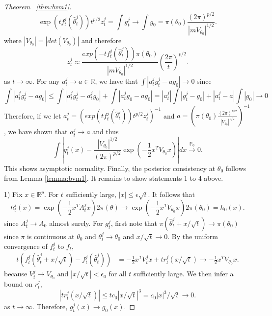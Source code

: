 \documentclass[twoside,11pt]{article}
\numberwithin{equation}{section}
\newcommand{\R}{{\mathbb{R}}}
\newcommand\bP{\mathbb{P}}
\newcommand{\pto}{\stackrel{\bP_0}{\to}}
\begin{document}
{\begin{proof}[Theorem ~\ref{thm:bvm1}]
\begin{equation*}
    \exp(t f_t^j(\hat\theta_t^j)) t^{p/2} z_t^j = \int g_t^j \to \int g_0 = \pi(\theta_0) \frac{(2\pi)^{p/2}}{|m V_{\theta_0}|^{1/2}}. 
\end{equation*}
where $|V_{\theta_0}| = |det(V_{\theta_0})|$ and therefore
\begin{equation*}
    z_t^j \approx \frac{exp(-t f_t^j(\hat\theta_t^j)) \pi(\theta_0)}{|m V_{\theta_0}|^{1/2}} (\frac{2\pi}{t})^{p/2}. 
\end{equation*}
as $t \to \infty$. 
For any $a_t^j \to a \in \R$, we have that $\int |a_t^j  g_t^j - ag_0| \to 0$ since 
\begin{equation*}
    \int |a_t^j  g_t^j - a g_0| \leq \int |a_t^j  g_t^j - a_t^j  g_0| + \int |a_t^j  g_0 - a g_0| = |a_t^j | \int |g_t^j - g_0| + |a_t^j  - a| \int |g_0| \to 0
\end{equation*}
Therefore, if we let $a_t^j  = (exp(tf_t^j(\hat\theta_t^j)) t^{p/2} z_t^j)^{-1}$ and $a = (\pi(\theta_0) \frac{(2\pi)^{p/2}}{|V_{\theta_0}|^{1/2}})^{-1}$, we have shown that $a_t^j \to a$ and thus 
\begin{equation*}
    \int |q_t^j(x) - \frac{|V_{\theta_0}|^{1/2}}{(2\pi)^{p/2}} \exp(-\frac{1}{2}x^T V_{\theta_0} x)| dx \pto 0. 
\end{equation*}
This shows asymptotic normality. Finally, the posterior consistency at $\theta_0$ follows from Lemma \ref{lemma:bvm1}. It remains to show statements 1 to 4 above. 

1) Fix $x \in \R^p$. For $t$ sufficiently large, $|x| \leq \epsilon \sqrt{t}$. It follows that 
\begin{equation*}
    h_t^j(x) = \exp(-\frac{1}{2}x^T A_t^j x) 2\pi(\theta) \to \exp(-\frac{1}{2}x^T V_{\theta_0} x) 2 \pi(\theta_0) = h_0(x). 
\end{equation*}
since $A_t^j \to A_0$ almost surely. For $g_t^j$, first note that $\pi(\hat\theta_t^j+ x/\sqrt{t}) \to \pi(\theta_0)$ since $\pi$ is continuous at $\theta_0$ and $\theta_t^j\to \theta_0$ and $x/\sqrt{t} \to 0$. By the uniform convergence of $f_t^j$ to $f_t$, 
\begin{align*}
    t(f_t^j(\hat\theta_t^j+ x/\sqrt{t}) - f_t^j(\hat\theta_t^j)) 
    &= -\frac{1}{2} x^T V_t^j x +  t r_t^j(x/\sqrt{t}) \to -\frac{1}{2} x^T V_{\theta_0} x. 
\end{align*}
because $V_t^j \to V_{\theta_0}$ and $|x/\sqrt{t}| < \epsilon_0$ for all $t$ sufficiently large. We then infer a bound on $r_t^j$, 
\begin{equation*}
    |t r_t^j(x/\sqrt{t})| \leq t c_0 |x/\sqrt{t}|^3 = c_0 |x|^3 / \sqrt{t} \to 0. 
\end{equation*}
as $t \to \infty$. Therefore, $g_t^j(x) \to g_0(x)$. 


\end{proof}}
\end{document}
